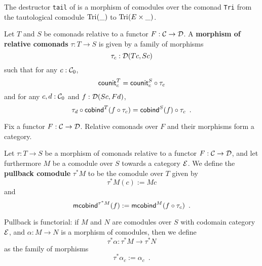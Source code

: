 \documentclass{amsart}
\newcommand{\fat}[1]{\textbf{#1}}
\begin{document}
% 
%   
% 
%  
%  





\begin{example}\label{ex:tail_comodule}
 The destructor \lstinline!tail! of  is a morphism of comodules over the comonad \lstinline!Tri! 
  from the tautological comodule  $\text{\lstinline!Tri!}(\_)$ to $\text{\lstinline!Tri!}(E\times \_)$.
\end{example}


\begin{definition}
 Let $T$ and $S$ be comonads relative to a functor $F : \C \to \D$. A \fat{morphism of relative comonads} $\tau : T \to S$
  is given by a family of morphisms \[\tau_c : \D(Tc,Sc)\] such that for any $c : \C_0$,
     \[  \counit^T_c = \comp{\tau_c}{\counit^S_c} \]
   and for any $c,d : \C_0$ and $f : \D(Sc,Fd)$,
   \[  \comp{\cobind^T(\comp{\tau_c}{f})}{\tau_d} = \comp{\tau_c}{\cobind^S(f)} \enspace .  \]
\end{definition}

\begin{remark}
 Fix a functor $F : \C\to\D$. Relative comonads over $F$ and their morphisms form a category.
\end{remark}


\begin{definition}\label{def:pullback_comodule}
  Let $\tau : T\to S$ be a morphism of comonads relative to a functor $F : \C \to \D$, and let furthermore $M$ be a 
  comodule over $S$ towards a category $\E$. We define the \fat{pullback comodule} $\tau^*M$ to be the comodule over $T$ given by
  \[  \tau^*M(c) := Mc \]
  and 
   \[ \mcobind^{\tau^*M}(f) := \mcobind^M(\comp{\tau_c}{f}) \enspace . \]
   
  \noindent
  Pullback is functorial: if $M$ and $N$ are comodules over $S$ with codomain category $\E$, and $\alpha : M\to N$ is 
    a morphism of comodules, then we define \[\tau^*\alpha : \tau^*M \to \tau^*N\] 
    as the family of morphisms
     \[ \tau^*\alpha_c := \alpha_c \enspace . \]
\end{definition}
\end{document}
